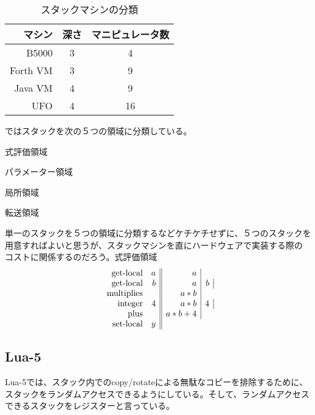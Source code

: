 {	\begin{table}[htbp] %
		\begin{center}\begin{tabular}{rcc} \hline
			マシン & 深さ & マニピュレータ数 \\ \hline
			B5000 & 3 & 4 \\
			Forth VM & 3 & 9 \\
			Java VM & 4 & 9 \\
			UFO & 4 & 16 \\
		\end{tabular}\end{center}
		\caption{スタックマシンの分類}\label{tbl:スタックマシンの分類}
	\end{table} %

	\cite{shannon2006}ではスタックを次の５つの領域に分類している。
	\begin{description}\setlength{\itemsep}{-1mm} %
		\item[e-stack] 式評価領域
		\item[p-stack] パラメーター領域
		\item[l-stack] 局所領域
		\item[x-stack] 転送領域
		\item[その他]
	\end{description} %
	単一のスタックを５つの領域に分類するなどケチケチせずに、５つのスタックを
	用意すればよいと思うが、スタックマシンを直にハードウェアで実装する際の
	コストに関係するのだろう。式評価領域
	\begin{equation*}\begin{array}{rr||r|r|}
		{\ensuremath{\operatorname{get-local}}} & a & a \\
		{\operatorname{get-local}} & b & a & b \\
		{\operatorname{multiplies}} & & a * b \\
		{\operatorname{integer}} & 4 & a * b & 4 \\
		{\operatorname{plus}} & & a * b + 4 \\
		{\operatorname{set-local}} & y \\
	\end{array}\end{equation*}
\subsection{Lua-5}\label{s2:Lua-5} %
	Lua-5では、スタック内でのcopy/rotateによる無駄なコピーを排除するために、
	スタックをランダムアクセスできるようにしている。そして、ランダムアクセス
	できるスタックをレジスターと言っている。
\endgroup %
}
